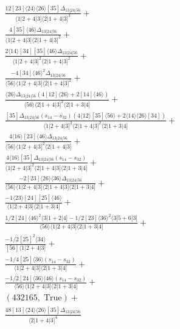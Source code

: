 \documentclass[varwidth, border=5pt]{standalone}
\begin{document}
\begin{my}
$\begin{gathered}
\scriptscriptstyle\frac{12[23]⟨24⟩⟨26⟩[35]Δ_{13|24|56}}{⟨1|2+4|3]⟨2|1+4|3]^3}+\\
\scriptscriptstyle\frac{4[35]⟨46⟩Δ_{13|24|56}}{⟨1|2+4|3]⟨2|1+4|3]^2}+\\
\scriptscriptstyle\frac{2⟨14⟩[34][35]⟨46⟩Δ_{13|24|56}}{⟨1|2+4|3]^2⟨2|1+4|3]^2}+\\
\scriptscriptstyle\frac{-4[34]⟨46⟩^2Δ_{13|24|56}}{⟨56⟩⟨1|2+4|3]⟨2|1+4|3]^2}+\\
\scriptscriptstyle\frac{⟨26⟩Δ_{13|24|56}(4[12]⟨26⟩+2[14]⟨46⟩)}{⟨56⟩⟨2|1+4|3]^2⟨2|1+3|4]}+\\
\scriptscriptstyle\frac{[35]Δ_{13|24|56}(s_{14}-s_{32})(4⟨12⟩[35]⟨56⟩+2⟨14⟩⟨26⟩[34])}{⟨1|2+4|3]^2⟨2|1+4|3]^2⟨2|1+3|4]}+\\
\scriptscriptstyle\frac{4⟨16⟩[23]⟨46⟩Δ_{13|24|56}}{⟨56⟩⟨1|2+4|3]^2⟨2|1+4|3]}+\\
\scriptscriptstyle\frac{4⟨16⟩[35]Δ_{13|24|56}(s_{14}-s_{32})}{⟨1|2+4|3]^2⟨2|1+4|3]⟨2|1+3|4]}+\\
\scriptscriptstyle\frac{-2[23]⟨26⟩⟨36⟩Δ_{13|24|56}}{⟨56⟩⟨1|2+4|3]⟨2|1+4|3]⟨2|1+3|4]}+\\
\scriptscriptstyle\frac{-1⟨23⟩[24][25]⟨46⟩}{⟨1|2+4|3]⟨2|1+3|4]}+\\
\scriptscriptstyle\frac{1/2[24]⟨46⟩^2⟨3|1+2|4]-1/2[23]⟨36⟩^2⟨3|5+6|3]}{⟨56⟩⟨1|2+4|3]⟨2|1+3|4]}+\\
\scriptscriptstyle\frac{-1/2[25]^2⟨34⟩}{[56]⟨1|2+4|3]}+\\
\scriptscriptstyle\frac{-1/4[25]⟨36⟩(s_{14}-s_{32})}{⟨1|2+4|3]⟨2|1+3|4]}+\\
\scriptscriptstyle\frac{-1/2[24]⟨36⟩⟨46⟩(s_{14}-s_{32})}{⟨56⟩⟨1|2+4|3]⟨2|1+3|4]}+\\
\scriptscriptstyle(432165,\;\text{True})+\\
\scriptscriptstyle\frac{48[13]⟨24⟩⟨26⟩[35]Δ_{13|24|56}}{⟨2|1+4|3]^4}\phantom{+}
\end{gathered}$
\end{my}
\end{document}
